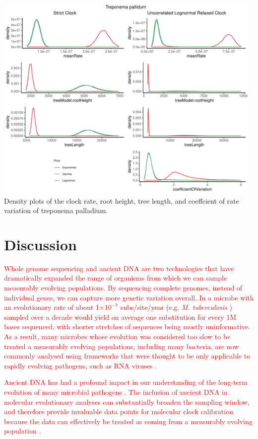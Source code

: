 \documentclass[10pt,letterpaper]{article}
\begin{document}
\begin{flushleft}
            \includegraphics[width=13cm]{sandbox_figures/treponema_density_plot.pdf}\newline
            Density plots of the clock rate, root height, tree length, and coeffcient of rate variation of treponema palladium.
            \end{flushleft}





\section*{Discussion}

\textcolor{red}{
Whole genome sequencing and ancient DNA are two technologies that have dramatically expanded the range of organisms from which we can sample measurably evolving populations. By sequencing complete genomes, instead of individual genes, we can capture more genetic variation overall. In a microbe with an evolutionary rate of about 1$\times 10^{-7}$ subs/site/year (e.g. \textit{M. tuberculosis} \cite{menardo2019molecular}) sampled over a decade would yield on average one substitution for every 1M bases sequenced, with shorter stretches of sequences being mostly uninformative. As a result, many microbes whose evolution was considered too slow to be treated a measurably evolving populations, including many bacteria, are now commonly analysed using frameworks that were thought to be only applicable to rapidly evolving pathogens, such as RNA viruses \cite{biek2015measurably}.}

\textcolor{red}{Ancient DNA has had a profound impact in our understanding of the long-term evolution of many microbial pathogens \cite{duchene2020recovery,spyrou2019ancient}. The inclusion of ancient DNA in molecular evolutionary analyses can substantially broaden the sampling window, and therefore provide invaluable data points for molecular clock calibration because the data can effectively be treated as coming from a measurably evolving population \cite{ho2020dating}.}
\end{document}
